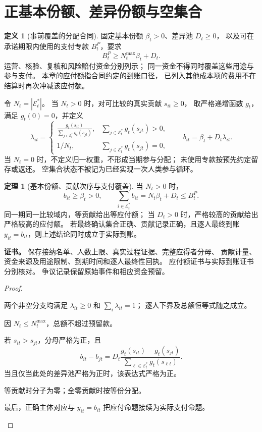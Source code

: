 \documentclass[UTF8,12pt,a4paper,openany,fontset=none,zihao=false]{ctexrep}
\theoremstyle{definition}
\newtheorem{definition}{定义}[chapter]
\newtheorem{theorem}{定理}[chapter]
\newenvironment{certificate}{\par\noindent\textbf{证书。}\ignorespaces}{\par}
\newcommand{\1}{\mathbf 1}
\begin{document}
\section{正基本份额、差异份额与空集合}

\begin{definition}[事前覆盖的分配合同]
\label{part:def-allocation}
固定基本份额 \(\beta_t>0\)、差异池 \(D_t\ge0\)，
以及可在承诺期限内使用的支付专款 \(B_t^P\)，要求
\[
 B_t^P\ge N_t^{\max}\beta_t+D_t.
\]
运营、核验、复核和风险赔付资金分别列示；
同一资金不得同时覆盖这些用途与参与支付。
本章的应付额指合同约定的到账口径，
已列入其他成本项的费用不在结算时再次冲减该应付额。

令 \(N_t=|\mathcal E_t^\ast|\)。
当 \(N_t>0\) 时，对可比较的真实贡献 \(s_{it}\ge0\)，
取严格递增函数 \(g_t\)，满足 \(g_t(0)=0\)，并定义
\[
 \lambda_{it}=
 \begin{cases}
 \displaystyle
 \frac{g_t(s_{it})}{\sum_{j\in\mathcal E_t^\ast}g_t(s_{jt})},
 &\displaystyle\sum_{j\in\mathcal E_t^\ast}g_t(s_{jt})>0,\\[1.2ex]
 1/N_t,&\displaystyle\sum_{j\in\mathcal E_t^\ast}g_t(s_{jt})=0,
 \end{cases}
 \qquad
 b_{it}=\beta_t+D_t\lambda_{it}.
\]
当 \(N_t=0\) 时，不定义归一权重，不形成当期参与分配；
未使用专款按预先约定留存或返还。
空集合状态不被记为已经实现一次人类参与循环。
\end{definition}

\begin{theorem}[基本份额、贡献次序与支付覆盖]
\label{part:thm-allocation}
当 \(N_t>0\) 时，
\[
 b_{it}\ge\beta_t>0,\qquad
 \sum_{i\in\mathcal E_t^\ast}b_{it}
 =N_t\beta_t+D_t\le B_t^P.
\]
同一期同一比较域内，等贡献给出等应付额；
当 \(D_t>0\) 时，严格较高的贡献给出严格较高的应付额。
若最终确认集合正确、贡献记录正确，且逐人最终到账
\(y_{it}=b_{it}\)，则上述结论同时成立于实际到账。
\end{theorem}
\begin{certificate}
保存接纳名单、人数上限、真实过程证据、完整应得者分母、
贡献计量、资金来源及用途限制、到期时间和逐人最终性回执。
应付额证书与实际到账证书分别核对。
争议记录保留原始事件和相应资金预留。
\end{certificate}
\begin{proof}
\begin{semanticsteps}
\item 两个非空分支均满足
\(\lambda_{it}\ge0\) 和 \(\sum_i\lambda_{it}=1\)；
逐人下界及总额恒等式随之成立。
\item 因 \(N_t\le N_t^{\max}\)，总额不超过预留款。
\item 若 \(s_{it}>s_{jt}\)，分母严格为正，且
\[
 b_{it}-b_{jt}
 =D_t\frac{g_t(s_{it})-g_t(s_{jt})}
 {\sum_{\ell\in\mathcal E_t^\ast}g_t(s_{\ell t})}.
\]
当且仅当此处的差异池严格为正时，该表达式严格为正。
\item 等贡献时分子为零；全零贡献时按等份分配。
\item 最后，正确主体对应与 \(y_{it}=b_{it}\)
把应付命题接续为实际支付命题。
\end{semanticsteps}
\end{proof}
\end{document}
